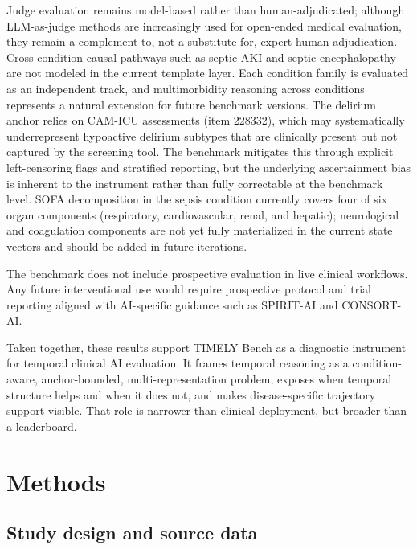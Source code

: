\documentclass[pdflatex,sn-nature]{sn-jnl}
\begin{document}
Judge evaluation remains model-based rather than human-adjudicated; although LLM-as-judge methods are increasingly used for open-ended medical evaluation, they remain a complement to, not a substitute for, expert human adjudication\cite{zheng2023judging,bedi2025medhelm}. Cross-condition causal pathways such as septic AKI and septic encephalopathy are not modeled in the current template layer. Each condition family is evaluated as an independent track, and multimorbidity reasoning across conditions represents a natural extension for future benchmark versions. The delirium anchor relies on CAM-ICU assessments (item 228332), which may systematically underrepresent hypoactive delirium subtypes that are clinically present but not captured by the screening tool. The benchmark mitigates this through explicit left-censoring flags and stratified reporting, but the underlying ascertainment bias is inherent to the instrument rather than fully correctable at the benchmark level. SOFA decomposition in the sepsis condition currently covers four of six organ components (respiratory, cardiovascular, renal, and hepatic); neurological and coagulation components are not yet fully materialized in the current state vectors and should be added in future iterations.

The benchmark does not include prospective evaluation in live clinical workflows. Any future interventional use would require prospective protocol and trial reporting aligned with AI-specific guidance such as SPIRIT-AI and CONSORT-AI\cite{rivera2020spiritai,liu2020consortai}.

Taken together, these results support TIMELY Bench as a diagnostic instrument for temporal clinical AI evaluation. It frames temporal reasoning as a condition-aware, anchor-bounded, multi-representation problem, exposes when temporal structure helps and when it does not, and makes disease-specific trajectory support visible. That role is narrower than clinical deployment, but broader than a leaderboard.

\section{Methods}

\subsection{Study design and source data}
\end{document}
